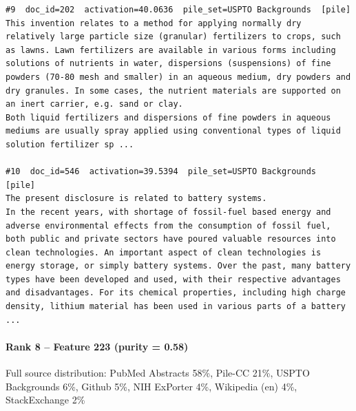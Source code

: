 \begin{verbatim}
#9  doc_id=202  activation=40.0636  pile_set=USPTO Backgrounds  [pile]
This invention relates to a method for applying normally dry relatively large particle size (granular) fertilizers to crops, such as lawns. Lawn fertilizers are available in various forms including solutions of nutrients in water, dispersions (suspensions) of fine powders (70-80 mesh and smaller) in an aqueous medium, dry powders and dry granules. In some cases, the nutrient materials are supported on an inert carrier, e.g. sand or clay.
Both liquid fertilizers and dispersions of fine powders in aqueous mediums are usually spray applied using conventional types of liquid solution fertilizer sp ...

#10  doc_id=546  activation=39.5394  pile_set=USPTO Backgrounds  [pile]
The present disclosure is related to battery systems.
In the recent years, with shortage of fossil-fuel based energy and adverse environmental effects from the consumption of fossil fuel, both public and private sectors have poured valuable resources into clean technologies. An important aspect of clean technologies is energy storage, or simply battery systems. Over the past, many battery types have been developed and used, with their respective advantages and disadvantages. For its chemical properties, including high charge density, lithium material has been used in various parts of a battery ...

\end{verbatim}

\paragraph*{Rank 8 -- Feature 223 (purity = 0.58)}

Full source distribution: PubMed Abstracts 58\%, Pile-CC 21\%, USPTO Backgrounds 6\%, Github 5\%, NIH ExPorter 4\%, Wikipedia (en) 4\%, StackExchange 2\%

